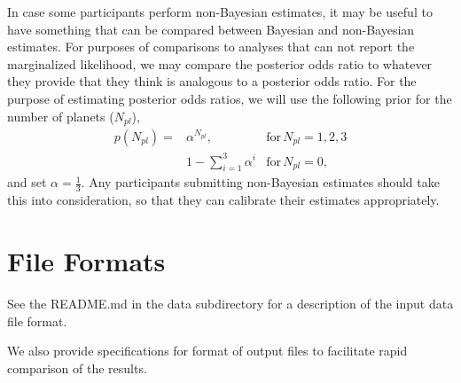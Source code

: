 \documentclass{article}
\begin{document}
In case some participants perform non-Bayesian estimates, it may be useful to have something that can be compared between Bayesian and non-Bayesian estimates.  For purposes of comparisons to analyses that can not report the marginalized likelihood, we may compare the posterior odds ratio to whatever they provide that they think is analogous to a posterior odds ratio.  
For the purpose of estimating posterior odds ratios, we will use the following prior for the number of planets ($N_{pl}$),
\begin{eqnarray}
p(N_{pl}) = & \alpha^{N_{pl}}, \,\, & \mathrm{for} \, N_{pl}={1,2,3} \\
            & 1-\sum_{i=1}^3 \alpha^i & \mathrm{for} \, N_{pl}=0,
\end{eqnarray}
and set $\alpha=\frac{1}{3}$.  
Any participants submitting non-Bayesian estimates should take this into consideration, so that they can calibrate their estimates appropriately. 

\section{File Formats}
See the README.md in the data subdirectory for a description of the input data file format.

We also provide specifications for format of output files to facilitate rapid comparison of the results. 
\end{document}
